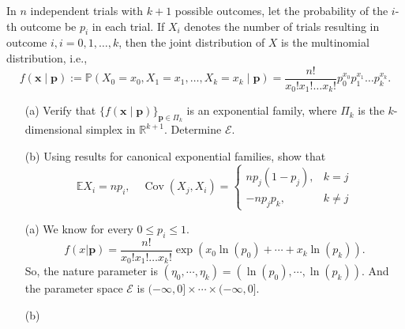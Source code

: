 \documentclass[12pt]{article}
\begin{document}
    \begin{exercise}
        In \(n\) independent trials with \(k+1\) possible outcomes, let the probability of the \(i\)-th outcome be \(p_{i}\) in each trial. If \(X_{i}\) denotes the number of trials resulting in outcome \(i, i=0,1, \ldots, k\), then the joint distribution of \(X\) is the multinomial distribution, i.e., 
        \[
            f(\mathbf{x} \mid \mathbf{p}):=\mathbb{P}\left(X_{0}=x_{0}, X_{1}=x_{1}, \ldots, X_{k}=x_{k} \mid \mathbf{p}\right)=\frac{n !}{x_{0} ! x_{1} ! \ldots x_{k} !} p_{0}^{x_{0}} p_{1}^{x_{1}} \ldots p_{k}^{x_{k}}. 
        \]
        \begin{itemize}
            \item[(a)] Verify that \(\{f(\mathbf{x} \mid \mathbf{p})\}_{\mathbf{p} \in \Pi_{k}}\) is an exponential family, where \(\Pi_{k}\) is the \(k\)-dimensional simplex in \(\mathbb{R}^{k+1}\). Determine \(\mathcal{E}\). 
            \item[(b)] Using results for canonical exponential families, show that
            \[
                \mathbb{E} X_{i}=n p_{i}, \quad \operatorname{Cov}\left(X_{j}, X_{i}\right)=\left\{\begin{array}{cc}
                n p_{j}\left(1-p_{j}\right), & k=j \\
                -n p_{j} p_{k}, & k \neq j
            \end{array}\right.
            \]
        \end{itemize}
    \end{exercise}

    \begin{solution}
        \begin{itemize}
            \item[(a)] We know for every \(0\leqslant p_i\leqslant 1\). 
            \[
                f(x|\mathbf{p})=\frac{n !}{x_{0} ! x_{1} ! \ldots x_{k} !} \exp\left(x_0\ln (p_0)+\cdots+x_k\ln (p_k)\right). 
            \]
            So, the nature parameter is $(\eta_0,\cdots,\eta_k)=(\ln(p_0),\cdots,\ln(p_k))$. And the parameter space \(\mathcal{E}\) is \((-\infty,0]\times\cdots\times(-\infty,0]\). 
            \item[(b)] 
        \end{itemize}
    \end{solution}
\end{document}
